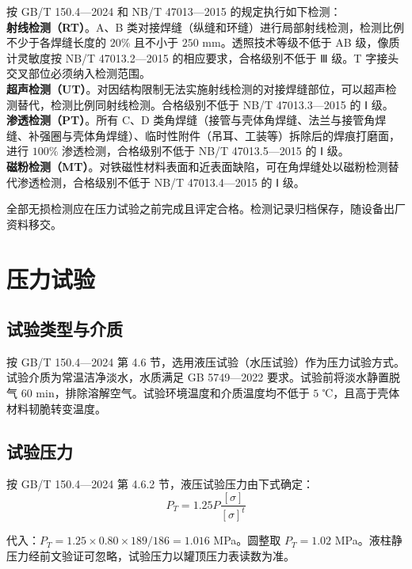 按 GB/T 150.4—2024 和 NB/T 47013—2015\cite{gbt150-2024,nbt47013-2015} 的规定执行如下检测：\\[4pt]
\textbf{射线检测（RT）}。A、B 类对接焊缝（纵缝和环缝）进行局部射线检测，检测比例不少于各焊缝长度的 $20\%$ 且不小于 $250$ mm。透照技术等级不低于 AB 级，像质计灵敏度按 NB/T 47013.2—2015 的相应要求，合格级别不低于 Ⅲ 级。T 字接头交叉部位必须纳入检测范围。\\[4pt]
\textbf{超声检测（UT）}。对因结构限制无法实施射线检测的对接焊缝部位，可以超声检测替代，检测比例同射线检测。合格级别不低于 NB/T 47013.3—2015 的 Ⅰ 级。\\[4pt]
\textbf{渗透检测（PT）}。所有 C、D 类角焊缝（接管与壳体角焊缝、法兰与接管角焊缝、补强圈与壳体角焊缝）、临时性附件（吊耳、工装等）拆除后的焊痕打磨面，进行 $100\%$ 渗透检测，合格级别不低于 NB/T 47013.5—2015 的 Ⅰ 级。\\[4pt]
\textbf{磁粉检测（MT）}。对铁磁性材料表面和近表面缺陷，可在角焊缝处以磁粉检测替代渗透检测，合格级别不低于 NB/T 47013.4—2015 的 Ⅰ 级。

全部无损检测应在压力试验之前完成且评定合格。检测记录归档保存，随设备出厂资料移交。

\section{压力试验}

\subsection{试验类型与介质}

按 GB/T 150.4—2024 第 4.6 节\cite{gbt150-2024}，选用液压试验（水压试验）作为压力试验方式。试验介质为常温洁净淡水，水质满足 GB 5749—2022 要求\cite{gb5749-2022}。试验前将淡水静置脱气 $60$ min，排除溶解空气。试验环境温度和介质温度均不低于 $5$ ℃，且高于壳体材料韧脆转变温度。



\subsection{试验压力}

按 GB/T 150.4—2024 第 4.6.2 节\cite{gbt150-2024}，液压试验压力由下式确定：
\begin{equation}
P_T = 1.25 P \frac{[\sigma]}{[\sigma]^t}
\label{eq:pt}
\end{equation}

代入：$P_T = 1.25 \times 0.80 \times 189 / 186 = 1.016$ MPa。圆整取 $P_T = 1.02$ MPa。液柱静压力经前文验证可忽略，试验压力以罐顶压力表读数为准。

